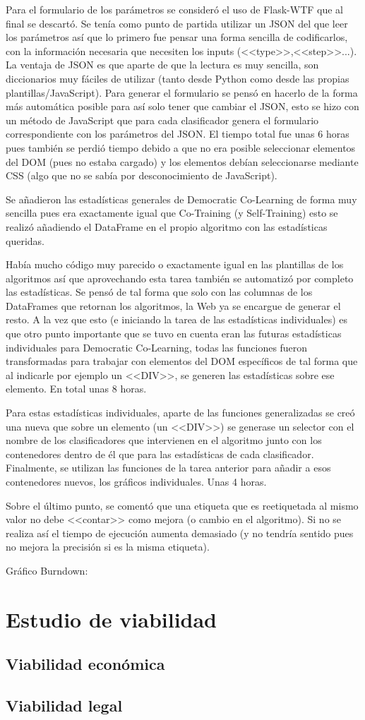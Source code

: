 Para el formulario de los parámetros se consideró el uso de Flask-WTF que al
final se descartó. Se tenía como punto de partida utilizar un JSON del que leer
los parámetros así que lo primero fue pensar una forma sencilla de codificarlos,
con la información necesaria que necesiten los inputs (<<type>>,<<step>>...). La
ventaja de JSON es que aparte de que la lectura es muy sencilla, son
diccionarios muy fáciles de utilizar (tanto desde Python como desde las propias
plantillas/JavaScript). Para generar el formulario se pensó en hacerlo de la
forma más automática posible para así solo tener que cambiar el JSON, esto se
hizo con un método de JavaScript que para cada clasificador genera el formulario
correspondiente con los parámetros del JSON. El tiempo total fue unas 6 horas
pues también se perdió tiempo debido a que no era posible seleccionar elementos
del DOM (pues no estaba cargado) y los elementos debían seleccionarse mediante
CSS (algo que no se sabía por desconocimiento de JavaScript).

Se añadieron las estadísticas generales de Democratic Co-Learning de forma muy
sencilla pues era exactamente igual que Co-Training (y Self-Training) esto se
realizó añadiendo el DataFrame en el propio algoritmo con las estadísticas
queridas.

Había mucho código muy parecido o exactamente igual en las plantillas de los
algoritmos así que aprovechando esta tarea también se automatizó por completo
las estadísticas. Se pensó de tal forma que solo con las columnas de los
DataFrames que retornan los algoritmos, la Web ya se encargue de generar el
resto. A la vez que esto (e iniciando la tarea de las estadísticas individuales)
es que otro punto importante que se tuvo en cuenta eran las futuras estadísticas
individuales para Democratic Co-Learning, todas las funciones fueron
transformadas para trabajar con elementos del DOM específicos de tal forma que
al indicarle por ejemplo un <<DIV>>, se generen las estadísticas sobre ese
elemento. En total unas 8 horas. 

Para estas estadísticas individuales, aparte de las funciones generalizadas se
creó una nueva que sobre un elemento (un <<DIV>>) se generase un selector con el
nombre de los clasificadores que intervienen en el algoritmo junto con los
contenedores dentro de él que para las estadísticas de cada clasificador.
Finalmente, se utilizan las funciones de la tarea anterior para añadir a esos
contenedores nuevos, los gráficos individuales. Unas 4 horas.

Sobre el último punto, se comentó que una etiqueta que es reetiquetada al mismo
valor no debe <<contar>> como mejora (o cambio en el algoritmo). Si no se
realiza así el tiempo de ejecución aumenta demasiado (y no tendría sentido pues
no mejora la precisión si es la misma etiqueta).


Gráfico Burndown:
\section{Estudio de viabilidad}

\subsection{Viabilidad económica}

\subsection{Viabilidad legal}


